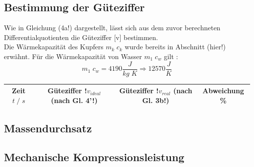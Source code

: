     \subsection{Bestimmung der Güteziffer}
    Wie in Gleichung (4a!) dargestellt, lässt sich aus dem zuvor berechneten
    Differentialquotienten die Güteziffer [v] bestimmen.\\
    Die Wärmekapazität des Kupfers $m_k\;c_k$ wurde bereits in Abschnitt (hier!) erwähnt.
    Für die Wärmekapazität von Wasser $m_1\;c_w$ gilt \cite{wasser}:
    \begin{equation*}
        m_1\;c_w = 4190\frac{J}{kg\;K} 	\Rightarrow 12570\frac{J}{K}
    \end{equation*}

    \begin{table}
        \centering
        \begin{tabular}{c c c c}
        \toprule
        Zeit $t\;/\;s$ & Güteziffer !$v_{ideal}$ (nach Gl. 4'!) & Güteziffer !$v_{real}$ (nach Gl. 3b!) & Abweichung \% \\
        \midrule

        \end{tabular}
    \end{table}
    \subsection{Massendurchsatz}
    \subsection{Mechanische Kompressionsleistung}
    
